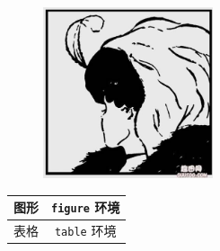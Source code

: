 \documentclass[nofonts]{ctexart}
\begin{document}
\begin{figure}[htbp]
	\centering
	\includegraphics[width=5cm]{lady.jpg}
\end{figure}
\begin{table}
	\centering
	\begin{tabular}{|c|c|}
		\hline
		图形	& \verb=figure=	环境	\\
		\hline
		表格	& \verb=table=	环境	\\
		\hline
	\end{tabular}
\end{table}
\end{document}
